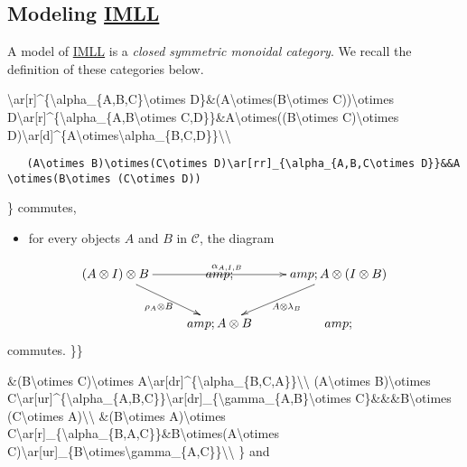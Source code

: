 \subsection{\texorpdfstring{Modeling \url{IMLL}}{Modeling IMLL}}\label{modeling-imll}

A model of \url{IMLL} is a \emph{closed symmetric monoidal category}. We
recall the definition of these categories below.

\textbackslash{}ar{[}r{]}\^{}\{\textbackslash{}alpha\_\{A,B,C\}\textbackslash{}otimes
D\}\&(A\textbackslash{}otimes(B\textbackslash{}otimes
C))\textbackslash{}otimes
D\textbackslash{}ar{[}r{]}\^{}\{\textbackslash{}alpha\_\{A,B\textbackslash{}otimes
C,D\}\}\&A\textbackslash{}otimes((B\textbackslash{}otimes
C)\textbackslash{}otimes
D)\textbackslash{}ar{[}d{]}\^{}\{A\textbackslash{}otimes\textbackslash{}alpha\_\{B,C,D\}\}\textbackslash{}\textbackslash{}

\texttt{~~~(A\textbackslash{}otimes~B)\textbackslash{}otimes(C\textbackslash{}otimes~D)\textbackslash{}ar{[}rr{]}\_\{\textbackslash{}alpha\_\{A,B,C\textbackslash{}otimes~D\}\}\&\&A\textbackslash{}otimes(B\textbackslash{}otimes~(C\textbackslash{}otimes~D))}

\} commutes,

\begin{itemize}
\tightlist
\item
  for every objects \(A\) and \(B\) in \(\mathcal{C}\), the diagram
\end{itemize}

\[\xymatrix{
    (A\otimes I)\otimes B\ar[dr]_{\rho_A\otimes B}\ar[rr]^{\alpha_{A,I,B}}&amp;&amp;\ar[dl]^{A\otimes\lambda_B}A\otimes(I\otimes B)\\
    &amp;A\otimes B&amp;
}\] commutes. \}\}

\&(B\textbackslash{}otimes C)\textbackslash{}otimes
A\textbackslash{}ar{[}dr{]}\^{}\{\textbackslash{}alpha\_\{B,C,A\}\}\textbackslash{}\textbackslash{}
(A\textbackslash{}otimes B)\textbackslash{}otimes
C\textbackslash{}ar{[}ur{]}\^{}\{\textbackslash{}alpha\_\{A,B,C\}\}\textbackslash{}ar{[}dr{]}\_\{\textbackslash{}gamma\_\{A,B\}\textbackslash{}otimes
C\}\&\&\&B\textbackslash{}otimes (C\textbackslash{}otimes
A)\textbackslash{}\textbackslash{} \&(B\textbackslash{}otimes
A)\textbackslash{}otimes
C\textbackslash{}ar{[}r{]}\_\{\textbackslash{}alpha\_\{B,A,C\}\}\&B\textbackslash{}otimes(A\textbackslash{}otimes
C)\textbackslash{}ar{[}ur{]}\_\{B\textbackslash{}otimes\textbackslash{}gamma\_\{A,C\}\}\textbackslash{}\textbackslash{}
\} and

